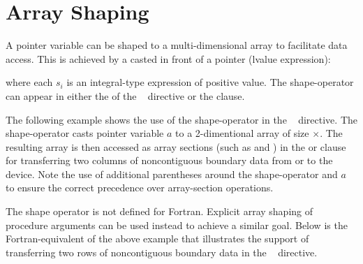 \section{Array Shaping}
\label{sec:array-shaping}



\ccppspecificstart
A pointer variable can be shaped to a multi-dimensional array to facilitate
data access. This is achieved by a  casted in front of 
a pointer (lvalue expression):
\begin{description}
\item[]\hspace*{5mm}
\end{description}
where each $s_i$ is an integral-type expression of positive value.
The shape-operator can appear in either the 
of the ~ directive or the  clause.

The following example shows the use of the shape-operator in the 
~ directive. The shape-operator \code{([nx][ny+2])}
casts pointer variable $a$ to a 2-dimentional array of size
$\times$.  The resulting array is then accessed as
array sections (such as \code{[0:nx][1]} and \code{[0:nx][ny]}) 
in the  or  clause for transferring two columns of 
noncontiguous boundary data from or to the device.  
Note the use of additional parentheses
around the shape-operator and $a$ to ensure the correct precedence 
over array-section operations.

\ccppspecificend
\clearpage

The shape operator is not defined for Fortran.  Explicit array shaping
of procedure arguments can be used instead to achieve a similar goal.
Below is the Fortran-equivalent of the above example that illustrates
the support of transferring two rows of noncontiguous boundary
data in the ~ directive.
 
